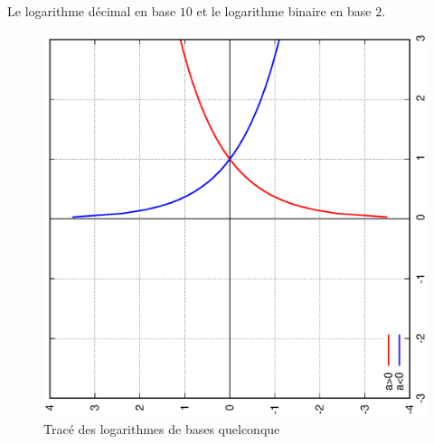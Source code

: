 Le logarithme décimal en base $10$ et le logarithme binaire en base $2$.
\begin{figure}
  \centering
  \includegraphics[scale=0.4,angle=-90]{logbase.ps}
  \caption{Tracé des logarithmes de bases quelconque}
  \label{fig:traceloga}
\end{figure}
